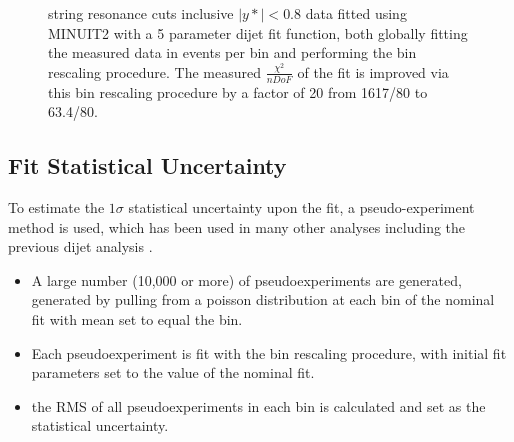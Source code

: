 \begin{figure}[!htb]
  \centering
  \caption{string resonance cuts inclusive $|y*|<0.8$ data fitted using MINUIT2 with a 5 parameter dijet fit function, both globally fitting the measured data in events per bin and performing the bin rescaling procedure. The measured $\frac{\chi^{2}}{nDoF}$ of the fit is improved via this bin rescaling procedure by a factor of 20 from 1617/80 to 63.4/80.}
  \label{fig:5ParamGlobalFitBinRescaleComparison}
\end{figure}

\subsection{Fit Statistical Uncertainty}
\label{subsec:fitStatUnc:GlobalFitting}

To estimate the $1\sigma$ statistical uncertainty upon the fit, a pseudo-experiment method is used, which has been used in many other analyses including the previous dijet analysis \cite{ATL-COM-PHYS-2018-1538}.

\begin{itemize}
    \item A large number (10,000 or more) of pseudoexperiments are generated, generated by pulling from a poisson distribution at each bin of the nominal fit with mean set to equal the bin.
    \item Each pseudoexperiment is fit with the bin rescaling procedure, with initial fit parameters set to the value of the nominal fit.
    \item the RMS of all pseudoexperiments in each bin is calculated and set as the statistical uncertainty.
\end{itemize}

